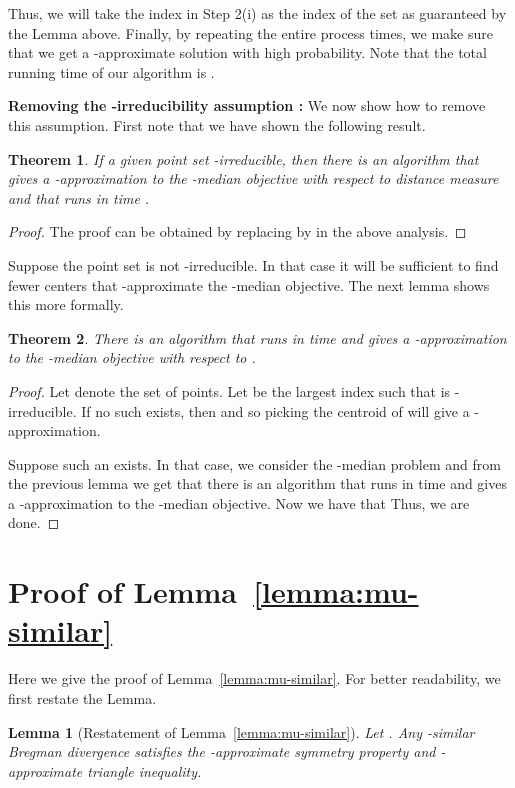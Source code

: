 \documentclass[a4paper]{article}
\newtheorem{theorem}{Theorem}
\newtheorem*{lm}{Lemma}
\begin{document}
 Thus, we will take the index  in Step 2(i) as the index of the set  as guaranteed by the Lemma above.
Finally, by repeating the entire process  times, we make sure that we get a -approximate solution
with high probability.
Note that the total running time of our algorithm is .

\noindent
{\bf Removing the -irreducibility assumption :} We now show how to remove this assumption. First note
that we have shown the following result.

\begin{theorem}
If a given point set -irreducible, then
there is an algorithm that gives a -approximation to the -median objective
with respect to distance measure  and that runs in time .
\end{theorem}
\begin{proof}
The proof can be obtained by replacing  by  in the above analysis. \end{proof}

Suppose the point set  is not -irreducible.
In that case it will be sufficient to find fewer centers that -approximate the -median objective.
The next lemma shows this more formally.

\begin{theorem}
There is an algorithm that runs in time  and
gives a -approximation to the -median objective with respect to .
\end{theorem}
\begin{proof}
Let  denote the set of points.  Let  be the largest index such that  is -irreducible.
If no such  exists, then 
and so picking the centroid of  will give a -approximation.

Suppose such an  exists. In that case, we consider the -median problem and from the previous lemma
we get that there is an algorithm that runs in time  
and gives a
-approximation to the -median objective.
Now we have that 
Thus, we are done.
\end{proof} 

\section{Proof of Lemma~\ref{lemma:mu-similar}}\label{appendix:B}

Here we give the proof of Lemma~\ref{lemma:mu-similar}. For better readability, we first restate the Lemma.
\begin{lm}[Restatement of Lemma~\ref{lemma:mu-similar}]
Let . Any -similar Bregman divergence satisfies the -approximate symmetry property and -approximate triangle inequality.
\end{lm}
\end{document}

